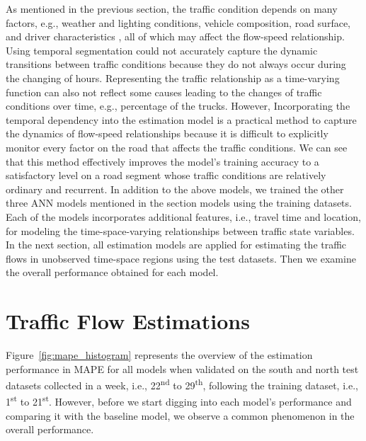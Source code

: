 \documentclass[english]{kththesis}
\begin{document}
As mentioned in the previous section, the traffic condition depends on many factors, e.g., weather and lighting conditions, vehicle composition, road surface, and driver characteristics \cite{seo_tse, wang_tse_online_calibration}, all of which may affect the flow-speed relationship. Using temporal segmentation could not accurately capture the dynamic transitions between traffic conditions because they do not always occur during the changing of hours. Representing the traffic relationship as a time-varying function can also not reflect some causes leading to the changes of traffic conditions over time, e.g., percentage of the trucks. However, Incorporating the temporal dependency into the estimation model is a practical method to capture the dynamics of flow-speed relationships because it is difficult to explicitly monitor every factor on the road that affects the traffic conditions. We can see that this method effectively improves the model's training accuracy to a satisfactory level on a road segment whose traffic conditions are relatively ordinary and recurrent. In addition to the above models, we trained the other three ANN models mentioned in the section models using the training datasets. Each of the models incorporates additional features, i.e., travel time and location, for modeling the time-space-varying relationships between traffic state variables. In the next section, all estimation models are applied for estimating the traffic flows in unobserved time-space regions using the test datasets. Then we examine the overall performance obtained for each model.

\section{Traffic Flow Estimations}
\label{sec:trafficFlowEstimations}

Figure~\ref{fig:mape_histogram} represents the overview of the estimation performance in MAPE for all models when validated on the south and north test datasets collected in a week, i.e., 22\textsuperscript{nd} to 29\textsuperscript{th}, following the training dataset, i.e., 1\textsuperscript{st} to 21\textsuperscript{st}. However, before we start digging into each model's performance and comparing it with the baseline model, we observe a common phenomenon in the overall performance. 
\end{document}

